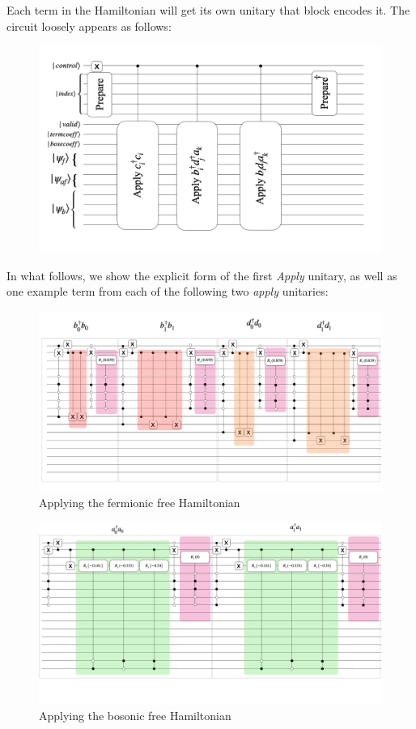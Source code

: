 Each term in the Hamiltonian will get its own unitary that block encodes it. The circuit loosely appears as follows:

\begin{figure}[h]
    \includegraphics[width = \linewidth]{figures/H_example_LOBE_circuit.png}
\end{figure}

In what follows, we show the explicit form of the first \textit{Apply} unitary, as well as one example term from each of the following two \textit{apply} unitaries:

\begin{figure}[h]
    \includegraphics[width = \linewidth]{figures/fermi_free.png}
    \caption{Applying the fermionic free Hamiltonian}
\end{figure}

\begin{figure}[h]
    \includegraphics[width = \linewidth]{figures/bose_free.png}
    \caption{Applying the bosonic free Hamiltonian}
\end{figure}

